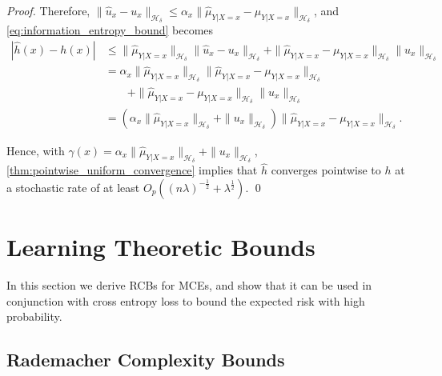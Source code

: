 \documentclass[runningheads, envcountsame, a4paper]{llncs}
\begin{document}
\begin{proof}
			Therefore, $\| \hat{u}_{x} - u_{x} \|_{\mathcal{H}_{\delta}} \leq \alpha_{x} \| \hat{\mu}_{Y | X = x} - \mu_{Y | X = x} \|_{\mathcal{H}_{\delta}}$, and \eqref{eq:information_entropy_bound} becomes
			\begin{equation}
			\begin{aligned}
				| \hat{h}(x) - h(x) | &\leq \| \hat{\mu}_{Y | X = x} \|_{\mathcal{H}_{\delta}} \| \hat{u}_{x} - u_{x} \|_{\mathcal{H}_{\delta}} + \| \hat{\mu}_{Y | X = x} - \mu_{Y | X = x} \|_{\mathcal{H}_{\delta}} \| u_{x} \|_{\mathcal{H}_{\delta}} \\
				&= \alpha_{x} \| \hat{\mu}_{Y | X = x} \|_{\mathcal{H}_{\delta}} \| \hat{\mu}_{Y | X = x} - \mu_{Y | X = x} \|_{\mathcal{H}_{\delta}} \\
				& \qquad + \| \hat{\mu}_{Y | X = x} - \mu_{Y | X = x} \|_{\mathcal{H}_{\delta}} \| u_{x} \|_{\mathcal{H}_{\delta}} \\
				&= ( \alpha_{x} \| \hat{\mu}_{Y | X = x} \|_{\mathcal{H}_{\delta}} + \| u_{x} \|_{\mathcal{H}_{\delta}} ) \| \hat{\mu}_{Y | X = x} - \mu_{Y | X = x} \|_{\mathcal{H}_{\delta}}.
			\end{aligned}
			\end{equation}
			
			Hence, with $\gamma(x) = \alpha_{x} \| \hat{\mu}_{Y | X = x} \|_{\mathcal{H}_{\delta}} + \| u_{x} \|_{\mathcal{H}_{\delta}}$, \cref{thm:pointwise_uniform_convergence} implies that $\hat{h}$ converges pointwise to $h$ at a stochastic rate of at least $O_{p}((n \lambda)^{-\frac{1}{2}} + \lambda^{\frac{1}{2}})$.
			\qed
		\end{proof}
	
	\newpage
	\section{Learning Theoretic Bounds}
	\label{app:learning_theoretic_bounds}
	
		In this section we derive \glspl{RCB} for \glspl{MCE}, and show that it can be used in conjunction with cross entropy loss to bound the expected risk with high probability.
		
		\subsection{Rademacher Complexity Bounds}
		\label{app:rademacher_complexity_theorems}
			
\end{document}
